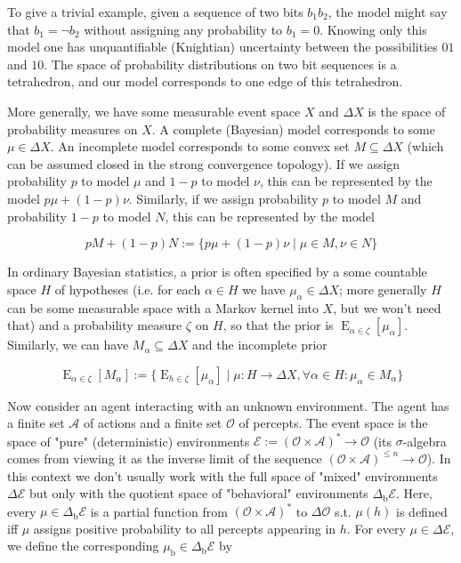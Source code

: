 \documentclass[a4paper]{article}
\DeclareMathOperator{\E}{E}
\newcommand{\SP}[1]{\Delta #1}
\newcommand{\Act}{\mathcal{A}}
\newcommand{\Per}{\mathcal{O}}
\newcommand{\His}{(\Per \times \Act)^*}
\newcommand{\Env}{\mathcal{E}}
\newcommand{\Beh}{\Delta_{\operatorname{b}}}
\newcommand{\EnvB}{\Beh\Env}
\begin{document}
To give a trivial example, given a sequence of two bits $b_1b_2$, the model might say that $b_1=\lnot b_2$ without assigning any probability to $b_1=0$. Knowing only this model one has unquantifiable (Knightian) uncertainty between the possibilities $01$ and $10$. The space of probability distributions on two bit sequences is a tetrahedron, and our model corresponds to one edge of this tetrahedron.

More generally, we have some measurable event space ${X}$ and ${\SP{X}}$ is the space of probability measures on ${X}$. A complete (Bayesian) model corresponds to some ${\mu \in \SP{X}}$. An incomplete model corresponds to some convex set ${M \subseteq \SP{X}}$ (which can be assumed closed in the strong convergence topology). If we assign probability ${p}$ to model ${\mu}$ and ${1-p}$ to model ${\nu}$, this can be represented by the model ${p \mu + (1-p) \nu}$. Similarly, if we assign probability ${p}$ to model ${M}$ and probability ${1-p}$ to model ${N}$, this can be represented by the model 

$${pM+(1-p)N:=\{p \mu + (1-p) \nu \mid \mu \in M, \nu \in N\}}$$

In ordinary Bayesian statistics, a prior is often specified by a some countable space ${H}$ of hypotheses (i.e. for each ${\alpha \in H}$ we have ${\mu_\alpha \in \SP{X}}$; more generally ${H}$ can be some measurable space with a Markov kernel into ${X}$, but we won't need that) and a probability measure ${\zeta}$ on ${H}$, so that the prior is ${\E_{\alpha \in \zeta}[\mu_\alpha]}$. Similarly, we can have ${M_\alpha \subseteq \SP{X}}$ and the incomplete prior

$${\E_{\alpha \in \zeta}[M_\alpha]:=\{\E_{h \in \zeta}[\mu_\alpha] \mid \mu: H \rightarrow \SP{X}, \forall \alpha \in H: \mu_\alpha \in M_\alpha\}}$$

Now consider an agent interacting with an unknown environment. The agent has a finite set ${\Act}$ of actions and a finite set ${\Per}$ of percepts. The event space is the space of "pure" (deterministic) environments ${\Env:=\His \rightarrow \Per}$ (its ${\sigma}$-algebra comes from viewing it as the inverse limit of the sequence ${(\Per \times \Act)^{\leq n} \rightarrow \Per}$). In this context we don't usually work with the full space of "mixed" environments ${\SP{\Env}}$ but only with the quotient space of "behavioral" environments  ${\EnvB}$. Here, every ${\mu \in \EnvB}$ is a partial function from ${\His}$ to ${\SP{\Per}}$ s.t. ${\mu(h)}$ is defined iff ${\mu}$ assigns positive probability to all percepts appearing in ${h}$. For every ${\mu \in \SP{\Env}}$, we define the corresponding ${\mu_{\operatorname{b}} \in \EnvB}$ by
\end{document}
